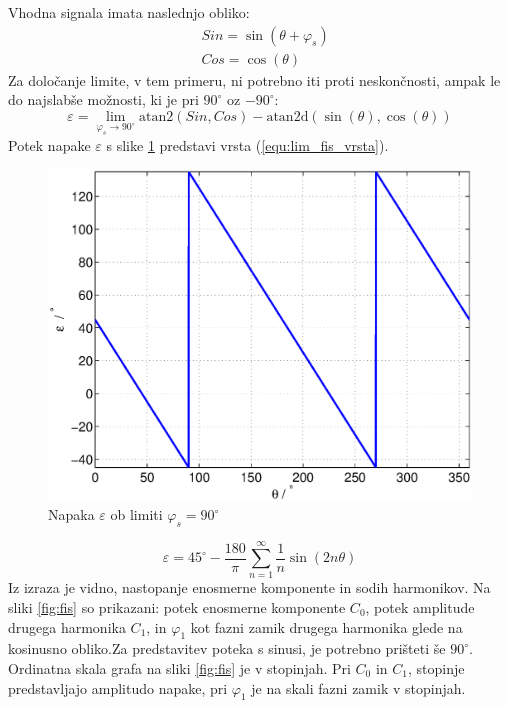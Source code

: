 \documentclass[a4paper]{article}
\begin{document}
Vhodna signala imata naslednjo obliko:
\begin{eqnarray}
\label{equ:def_sin_fis}
&Sin = \sin(\theta + \varphi_{s})\\
\label{equ:def_cos_fis}
&Cos =\cos(\theta)
\end{eqnarray}
Za določanje limite, v tem primeru, ni potrebno iti proti neskončnosti, ampak le do najslabše možnosti, ki je pri $90^\circ$ oz $-90^\circ$:
\begin{equation}
\label{equ:fis_lim}
\varepsilon = \lim_{\varphi_{s} \rightarrow 90^\circ} \mathrm{atan2}(Sin ,Cos)- \mathrm{atan2d}(\sin(\theta),\cos(\theta))
\end{equation}
Potek napake $\varepsilon$ s slike \ref{fig:lim_sin_fis} predstavi vrsta (\ref{equ:lim_fis_vrsta}).
\begin{figure}[!htb]
    \begin{center}
        \includegraphics[width=\linewidth]{./Slike/lim_sinfaza.eps}
        \caption{Napaka $\varepsilon$ ob limiti $\varphi_{s} = 90^\circ$} \label{fig:lim_sin_fis}
    \end{center}
\end{figure}
\begin{equation}
\label{equ:lim_fis_vrsta}
\varepsilon = 45^\circ - \frac{180}{\pi}\sum_{n=1}^{\infty}\frac{1}{n} \sin (2n \theta)
\end{equation} 
Iz  izraza je vidno, nastopanje enosmerne komponente in sodih harmonikov. Na sliki \ref{fig:fis} so prikazani: potek enosmerne komponente $C_0$, potek amplitude drugega harmonika $C_1$, in $\varphi_1$ kot fazni zamik drugega harmonika glede na kosinusno obliko.Za predstavitev poteka s sinusi, je potrebno prišteti še $90^\circ$. Ordinatna skala grafa na sliki \ref{fig:fis} je v stopinjah. Pri $C_0$ in $C_1$, stopinje predstavljajo amplitudo napake, pri $\varphi_{1}$ je na skali fazni zamik v stopinjah.
\end{document}
